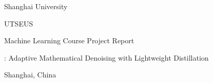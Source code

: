 \begin{titlepage}
  \centering
  \vspace*{1.5cm}

  {\LARGE Shanghai University\par}
  \vspace{0.4cm}
  {\large UTSEUS \par}
  \vspace{0.4cm}
  {\large Machine Learning Course Project Report\par}

  \vspace{2.5cm}

  {\Huge\bfseries \projectname\par}
  \vspace{0.8cm}
  {\Large \projectshort: Adaptive Mathematical Denoising with Lightweight Distillation\par}

  \vspace{2.0cm}

  {\large Shanghai, China\par}
  \vspace{0.5cm}
\end{titlepage}
